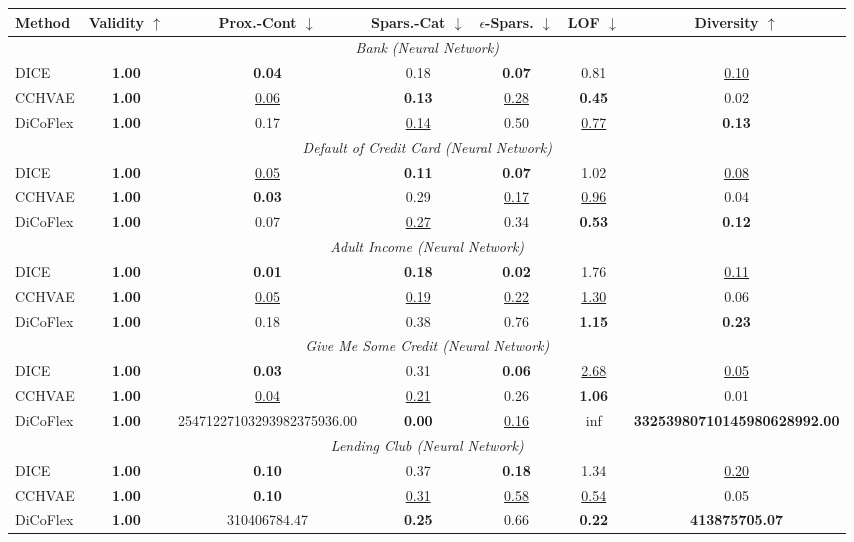 \begin{table}[H]
\label{tab:protocol_B}
\centering
\setlength{\tabcolsep}{3pt}
\begin{tabular}{lcccccc}
\toprule
\textbf{Method} & \textbf{Validity $\uparrow$} & \textbf{Prox.-Cont $\downarrow$} & \textbf{Spars.-Cat $\downarrow$} & \textbf{$\epsilon$-Spars. $\downarrow$} & \textbf{LOF $\downarrow$} & \textbf{Diversity $\uparrow$} \\
\midrule
\multicolumn{7}{c}{\textit{Bank (Neural Network)}} \\
\midrule
DICE & \textbf{1.00} & \textbf{0.04} & 0.18 & \textbf{0.07} & 0.81 & \underline{0.10} \\
CCHVAE & \textbf{1.00} & \underline{0.06} & \textbf{0.13} & \underline{0.28} & \textbf{0.45} & 0.02 \\
DiCoFlex & \textbf{1.00} & 0.17 & \underline{0.14} & 0.50 & \underline{0.77} & \textbf{0.13} \\
\multicolumn{7}{c}{\textit{Default of Credit Card (Neural Network)}} \\
\midrule
DICE & \textbf{1.00} & \underline{0.05} & \textbf{0.11} & \textbf{0.07} & 1.02 & \underline{0.08} \\
CCHVAE & \textbf{1.00} & \textbf{0.03} & 0.29 & \underline{0.17} & \underline{0.96} & 0.04 \\
DiCoFlex & \textbf{1.00} & 0.07 & \underline{0.27} & 0.34 & \textbf{0.53} & \textbf{0.12} \\
\multicolumn{7}{c}{\textit{Adult Income (Neural Network)}} \\
\midrule
DICE & \textbf{1.00} & \textbf{0.01} & \textbf{0.18} & \textbf{0.02} & 1.76 & \underline{0.11} \\
CCHVAE & \textbf{1.00} & \underline{0.05} & \underline{0.19} & \underline{0.22} & \underline{1.30} & 0.06 \\
DiCoFlex & \textbf{1.00} & 0.18 & 0.38 & 0.76 & \textbf{1.15} & \textbf{0.23} \\
\multicolumn{7}{c}{\textit{Give Me Some Credit (Neural Network)}} \\
\midrule
DICE & \textbf{1.00} & \textbf{0.03} & 0.31 & \textbf{0.06} & \underline{2.68} & \underline{0.05} \\
CCHVAE & \textbf{1.00} & \underline{0.04} & \underline{0.21} & 0.26 & \textbf{1.06} & 0.01 \\
DiCoFlex & \textbf{1.00} & 25471227103293982375936.00 & \textbf{0.00} & \underline{0.16} & inf & \textbf{33253980710145980628992.00} \\
\multicolumn{7}{c}{\textit{Lending Club (Neural Network)}} \\
\midrule
DICE & \textbf{1.00} & \textbf{0.10} & 0.37 & \textbf{0.18} & 1.34 & \underline{0.20} \\
CCHVAE & \textbf{1.00} & \textbf{0.10} & \underline{0.31} & \underline{0.58} & \underline{0.54} & 0.05 \\
DiCoFlex & \textbf{1.00} & 310406784.47 & \textbf{0.25} & 0.66 & \textbf{0.22} & \textbf{413875705.07} \\
\bottomrule
\end{tabular}
\end{table}
